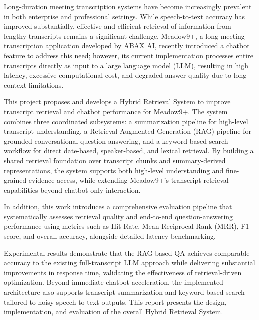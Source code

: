 Long-duration meeting transcription systems have become increasingly prevalent in both enterprise and professional settings. While speech-to-text accuracy has improved substantially, effective and efficient retrieval of information from lengthy transcripts remains a significant challenge. Meadow9+, a long-meeting transcription application developed by ABAX AI, recently introduced a chatbot feature to address this need; however, its current implementation processes entire transcripts directly as input to a large language model (LLM), resulting in high latency, excessive computational cost, and degraded answer quality due to long-context limitations.

This project proposes and develops a Hybrid Retrieval System to improve transcript retrieval and chatbot performance for Meadow9+. The system combines three coordinated subsystems: a summarization pipeline for high-level transcript understanding, a Retrieval-Augmented Generation (RAG) pipeline for grounded conversational question answering, and a keyword-based search workflow for direct date-based, speaker-based, and lexical retrieval. By building a shared retrieval foundation over transcript chunks and summary-derived representations, the system supports both high-level understanding and fine-grained evidence access, while extending Meadow9+’s transcript retrieval capabilities beyond chatbot-only interaction. 

In addition, this work introduces a comprehensive evaluation pipeline that systematically assesses retrieval quality and end-to-end question-answering performance using metrics such as Hit Rate, Mean Reciprocal Rank (MRR), F1 score, and overall accuracy, alongside detailed latency benchmarking.

Experimental results demonstrate that the RAG-based QA achieves comparable accuracy to the existing full-transcript LLM approach while delivering substantial improvements in response time, validating the effectiveness of retrieval-driven optimization. Beyond immediate chatbot acceleration, the implemented architecture also supports transcript summarization and keyword-based search tailored to noisy speech-to-text outputs. This report presents the design, implementation, and evaluation of the overall Hybrid Retrieval System.
